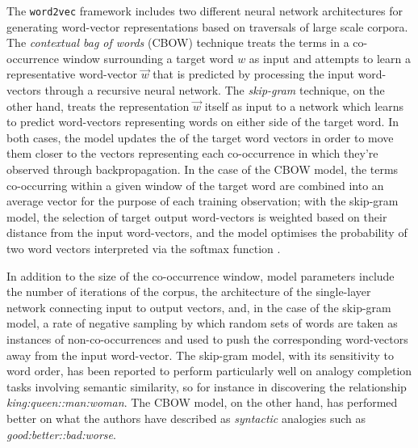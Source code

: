 The \texttt{word2vec} framework includes two different neural network architectures for generating word-vector representations based on traversals of large scale corpora.  The \emph{contextual bag of words} (CBOW) technique treats the terms in a co-occurrence window surrounding a target word $w$ as input and attempts to learn a representative word-vector $\overrightarrow{w}$ that is predicted by processing the input word-vectors through a recursive neural network.  The \emph{skip-gram} technique, on the other hand, treats the representation $\overrightarrow{w}$ itself as input to a network which learns to predict word-vectors representing words on either side of the target word.  In both cases, the model updates the  of the target word vectors in order to move them closer to the vectors representing each co-occurrence in which they're observed through backpropagation.  In the case of the CBOW model, the terms co-occurring within a given window of the target word are combined into an average vector for the purpose of each training observation; with the skip-gram model, the selection of target output word-vectors is weighted based on their distance from the input word-vectors, and the model optimises the probability of two word vectors interpreted via the softmax function \citep[see][for more details]{MikolovEA2013c}.

In addition to the size of the co-occurrence window, model parameters include the number of iterations of the corpus, the architecture of the single-layer network connecting input to output vectors, and, in the case of the skip-gram model, a rate of negative sampling by which random sets of words are taken as instances of non-co-occurrences and used to push the corresponding word-vectors away from the input word-vector.  The skip-gram model, with its sensitivity to word order, has been reported to perform particularly well on analogy completion tasks involving semantic similarity, so for instance in discovering the relationship \emph{king:queen::man:woman}.  The CBOW model, on the other hand, has performed better on what the authors have described as \emph{syntactic} analogies such as \emph{good:better::bad:worse}.

